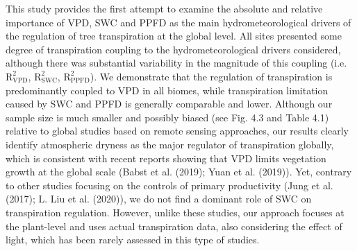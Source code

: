 \documentclass[11pt,twoside]{reedthesis}
\begin{document}
This study provides the first attempt to examine the absolute and
relative importance of VPD, SWC and PPFD as the main hydrometeorological
drivers of the regulation of tree transpiration at the global level. All
sites presented some degree of transpiration coupling to the
hydrometeorological drivers considered, although there was substantial
variability in the magnitude of this coupling (i.e.
\(\text{R}^2_{\text{VPD}}\), \(\text{R}^2_{\text{SWC}}\),
\(\text{R}^2_{\text{PPFD}}\)). We demonstrate that the regulation of
transpiration is predominantly coupled to VPD in all biomes, while
transpiration limitation caused by SWC and PPFD is generally comparable
and lower. Although our sample size is much smaller and possibly biased
(see Fig. 4.3 and Table 4.1) relative to global studies based on remote
sensing approaches, our results clearly identify atmospheric dryness as
the major regulator of transpiration globally, which is consistent with
recent reports showing that VPD limits vegetation growth at the global
scale (Babst et al. (2019); Yuan et al. (2019)). Yet, contrary to other
studies focusing on the controls of primary productivity (Jung et al.
(2017); L. Liu et al. (2020)), we do not find a dominant role of SWC on
transpiration regulation. However, unlike these studies, our approach
focuses at the plant-level and uses actual transpiration data, also
considering the effect of light, which has been rarely assessed in this
type of studies.\par
\end{document}
